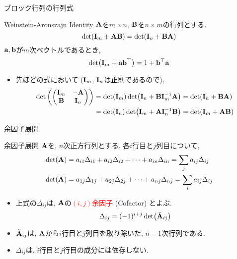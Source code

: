 \documentclass[dvipdfmx,notheorems,t]{beamer}
\begin{document}
\begin{frame}{ブロック行列の行列式}
\begin{block}{Weinstein-Aronszajn Identity}
  $\vb{A}$を$m \times n$, $\vb{B}$を$n \times m$の行列とする.
  $$\det(\vb{I}_m + \vb{A} \vb{B}) = \det(\vb{I}_n + \vb{B} \vb{A})$$
  $\vb{a}, \vb{b}$が$m$次ベクトルであるとき,
  $$\det(\vb{I}_m + \vb{a} \vb{b}^\top) = 1 + \vb{b}^\top \vb{a}$$
\end{block}

\begin{itemize}
  \item 先ほどの式において ($\vb{I}_m$, $\vb{I}_n$は正則であるので),
  \begin{align*}
    \det\left( \mqty(\vb{I}_m & -\vb{A} \\ \vb{B} & \vb{I}_n) \right)
      &= \det(\vb{I}_m) \det(\vb{I}_n + \vb{B} \vb{I}_m^{-1} \vb{A})
      = \det(\vb{I}_n + \vb{B} \vb{A}) \\
      &= \det(\vb{I}_n) \det(\vb{I}_m + \vb{A} \vb{I}_n^{-1} \vb{B})
      = \det(\vb{I}_m + \vb{A} \vb{B})
  \end{align*}
\end{itemize}
\end{frame}

\begin{frame}{余因子展開}
\begin{block}{余因子展開}
  $\vb{A}$を, $n$次正方行列とする. 各$i$行目と$j$列目について,
  \begin{align*}
    \det(\vb{A}) &= a_{i1} \Delta_{i1} + a_{i2} \Delta_{i2} + \cdots + a_{in} \Delta_{in}
      = \sum_j a_{ij} \Delta_{ij} \\
    \det(\vb{A}) &= a_{1j} \Delta_{1j} + a_{2j} \Delta_{2j} + \cdots + a_{nj} \Delta_{nj}
      = \sum_i a_{ij} \Delta_{ij}
  \end{align*}
\end{block}

\begin{itemize}
  \item 上式の$\Delta_{ij}$は, $\vb{A}$の\textcolor{red}{$(i, j)$余因子} (Cofactor) とよぶ.
  $$\Delta_{ij} = (-1)^{i + j} \det(\tilde{\vb{A}}_{ij})$$
  \item $\tilde{\vb{A}}_{ij}$は, $\vb{A}$から$i$行目と$j$列目を取り除いた, $n - 1$次行列である.
  \item $\Delta_{ij}$は, $i$行目と$j$行目の成分には依存しない.
\end{itemize}
\end{frame}
\end{document}
